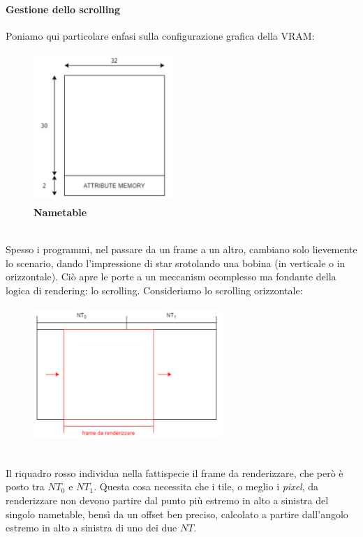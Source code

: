 \documentclass[11pt]{article}
\begin{document}
\paragraph{Gestione dello scrolling} Poniamo qui particolare enfasi sulla configurazione grafica della VRAM:
\begin{figure}[h]
\centering
\includegraphics[width=200px, height=215px]{NAMETABLE.jpg}\\
\small\textbf{Nametable}
\end{figure}\\
Spesso i programmi, nel passare da un frame a un altro, cambiano solo lievemente lo scenario, dando l'impressione di star srotolando una bobina (in verticale o in orizzontale). Ciò apre le porte a un meccanism ocomplesso ma fondante della logica di rendering: lo scrolling.
\clearpage
Consideriamo lo scrolling orizzontale:
\begin{figure}[h]
\centering
\includegraphics[width=270px, height=190px]{HOR_SCROLL.png}
\end{figure}\\
Il riquadro rosso individua nella fattispecie il frame da renderizzare, che però è posto tra $NT_0$ e $NT_1$. Questa cosa necessita che i tile, o meglio i \emph{pixel}, da renderizzare non devono partire dal punto più estremo in alto a sinistra del singolo nametable, bensì da un offset ben preciso, calcolato a partire dall'angolo estremo in alto a sinistra di uno dei due $NT$.\\
\end{document}
